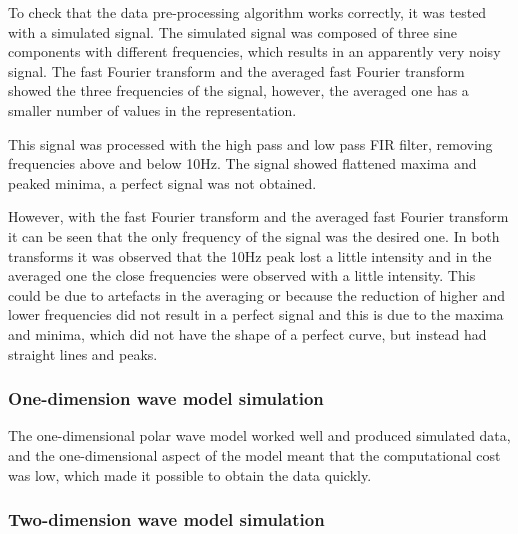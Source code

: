 \documentclass[12pt, a4paper]{article} %
\begin{document}
To check that the data pre-processing algorithm works correctly, it was tested with a simulated signal. The simulated signal was composed of three sine components with different frequencies, which results in an apparently very noisy signal. The fast Fourier transform and the averaged fast Fourier transform showed the three frequencies of the signal, however, the averaged one has a smaller number of values in the representation. 

\setlength{\parskip}{4mm}

This signal was processed with the high pass and low pass FIR filter, removing frequencies above and below 10Hz. The signal showed flattened maxima and peaked minima, a perfect signal was not obtained.

However, with the fast Fourier transform and the averaged fast Fourier transform it can be seen that the only frequency of the signal was the desired one. In both transforms it was observed that the 10Hz peak lost a little intensity and in the averaged one the close frequencies were observed with a little intensity. This could be due to artefacts in the averaging or because the reduction of higher and lower frequencies did not result in a perfect signal and this is due to the maxima and minima, which did not have the shape of a perfect curve, but instead had straight lines and peaks.

\setlength{\parskip}{0mm}

\subsubsection{One-dimension wave model simulation}

The one-dimensional polar wave model worked well and produced simulated data, and the one-dimensional aspect of the model meant that the computational cost was low, which made it possible to obtain the data quickly.

\setlength{\parskip}{0mm}

\subsubsection{Two-dimension wave model simulation}
\end{document}
